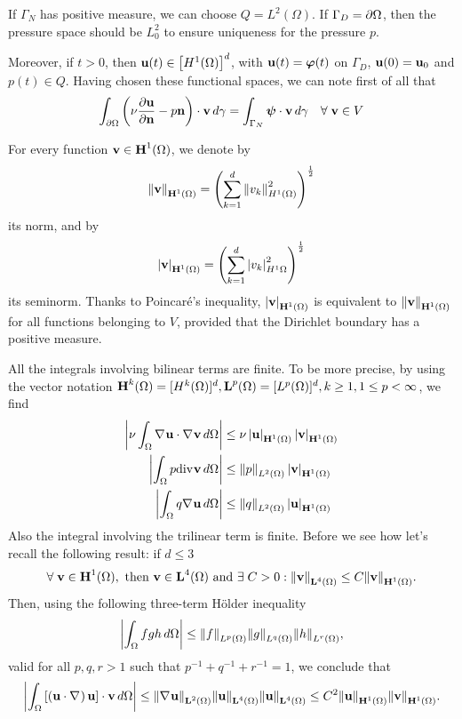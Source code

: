 If \(\Gamma_N\) has positive measure, we can choose \(Q = L^2(\Omega)\). If \(\Gamma_D = {\partial\Omega}\), then the pressure space should be \(L^2_0\) to ensure uniqueness for the pressure \(p\). 

Moreover, if \(t>0\), then \(\textbf{u}(t) \in \left[ H^1(\Omega) \right]^d\), with \(\textbf{u}(t) = \bm{\varphi}(t)\) on \(\Gamma_D\), \(\textbf{u}(0) = \textbf{u}_0\) and \(p(t) \in Q\). 
Having chosen these functional spaces, we can note first of all that 
\[
    \int_\boundary \left( \nu\partialderivative{\uvec}{\normal} - p\normal \right) \cdot \vvec \, d\gamma = \int_{\Gamma_N} \bm{\psi} \cdot \vvec \, d\gamma \quad \forall \; \vvec \in V
\]
\begin{notation}
    For every function \(\textbf{v} \in \textbf{H}^1(\Omega)\), we denote by 
    \[
        \norm{\textbf{v}}_{\textbf{H}^1(\Omega)} = \left( \sum_{k=1}^{d}\norm{v_k}_{H^1(\Omega)}^2 \right)^{\frac{1}{2}}
    \]
    its norm, and by 
    \[
        \left\lvert\textbf{v}\right\rvert_{\textbf{H}^1(\Omega)} = \left( \sum_{k=1}^{d} \left\lvert v_k\right\rvert_{H^1{\Omega}}^2 \right)^{\frac{1}{2}}
    \]
    its seminorm. Thanks to Poincaré's inequality, \(\left\lvert\textbf{v}\right\rvert_{\textbf{H}^1(\Omega)}\) is equivalent to \(\norm{\textbf{v}}_{\textbf{H}^1(\Omega)}\) for all functions belonging to \(V\), provided that the Dirichlet boundary has a positive measure.
\end{notation}
All the integrals involving bilinear terms are finite. To be more precise, by using the vector notation \(\textbf{H}^k(\Omega) = [H^k(\Omega)]^d, \textbf{L}^p(\Omega) = [L^p(\Omega)]^d, k \geq 1, 1\leq p < \infty\), we find 
\begin{align*}
    \abs{\nu \int_\Omega \nabla\mspace{1mu} \textbf{u} \cdot \nabla\mspace{1mu} \textbf{v} \, d\Omega} &\leq \nu \left\lvert\textbf{u}\right\rvert_{\textbf{H}^1(\Omega)} \left\lvert\textbf{v}\right\rvert_{\textbf{H}^1(\Omega)} \\
    \abs{\int_\Omega p\text{div}\mspace{1mu} \textbf{v} \, d\Omega} &\leq \norm{p}_{L^2(\Omega)} \left\lvert\textbf{v}\right\rvert_{\textbf{H}^1(\Omega)} \\
    \abs{\int_\Omega q\nabla\mspace{1mu} \textbf{u} \, d\Omega} &\leq \norm{q}_{L^2(\Omega)} \left\lvert\textbf{u}\right\rvert_{\textbf{H}^1(\Omega)}
\end{align*}
Also the integral involving the trilinear term is finite. Before we see how let's recall the following result: if \(d \leq 3\)
\[
    \forall \; \textbf{v} \in \textbf{H}^1(\Omega), \text{ then } \textbf{v} \in \textbf{L}^4(\Omega) \text{ and } \exists \; C > 0 : \norm{\textbf{v}}_{\textbf{L}^4(\Omega)} \leq C \norm{\textbf{v}}_{\textbf{H}^1(\Omega)}.
\]
Then, using the following three-term Hölder inequality 
\[
    \abs{\int_\Omega fgh \, d\Omega} \leq \norm{f}_{L^p(\Omega)} \norm{g}_{L^q(\Omega)} \norm{h}_{L^r(\Omega)},
\]
valid for all \(p, q, r > 1\) such that \(p^{-1} + q^{-1} + r^{-1} = 1\), we conclude that 
\[
    \abs{\int_\Omega \left[ \left( \textbf{u} \cdot \nabla\mspace{1mu} \right) \textbf{u} \right] \cdot \textbf{v} \, d\Omega} \leq \norm{\nabla\mspace{1mu} \textbf{u}}_{\textbf{L}^2(\Omega)} \norm{\textbf{u}}_{\textbf{L}^4(\Omega)} \norm{\textbf{u}}_{\textbf{L}^4(\Omega)} \leq C^2 \norm{\textbf{u}}_{\textbf{H}^1(\Omega)}\norm{\textbf{v}}_{\textbf{H}^1(\Omega)}.
\]
